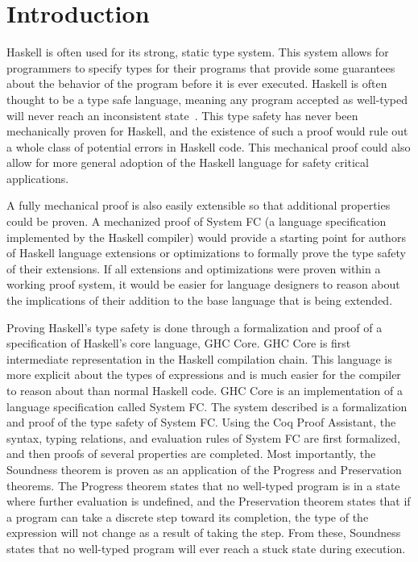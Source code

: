 \documentclass{sig-alternate}
\begin{document}

\section{Introduction}
\label{sec:intro}

Haskell is often used for its strong, static type system. This system allows for programmers to specify types for their programs that provide some guarantees about the behavior of the program before it is ever executed. Haskell is often thought to be a type safe language, meaning any program accepted as well-typed will never reach an inconsistent state~\cite{Pierce:SF}. This type safety has never been mechanically proven for Haskell, and the existence of such a proof would rule out a whole class of potential errors in Haskell code. This mechanical proof could also allow for more general adoption of the Haskell language for safety critical applications.

A fully mechanical proof is also easily extensible so that additional properties could be proven. A mechanized proof of System FC (a language specification implemented by the Haskell compiler) would provide a starting point for authors of Haskell language extensions or optimizations to formally prove the type safety of their extensions. If all extensions and optimizations were proven within a working proof system, it would be easier for language designers to reason about the implications of their addition to the base language that is being extended.

Proving Haskell's type safety is done through a formalization and proof of a specification of Haskell's core language, GHC Core. GHC Core is first intermediate representation in the Haskell compilation chain. This language is more explicit about the types of expressions and is much easier for the compiler to reason about than normal Haskell code. GHC Core is an implementation of a language specification called System FC. The system described is a formalization and proof of the type safety of System FC. Using the Coq Proof Assistant, the syntax, typing relations, and evaluation rules of System FC are first formalized, and then proofs of several properties are completed. Most importantly, the Soundness theorem is proven as an application of the Progress and Preservation theorems. The Progress theorem states that no well-typed program is in a state where further evaluation is undefined, and the Preservation theorem states that if a program can take a discrete step toward its completion, the type of the expression will not change as a result of taking the step. From these, Soundness states that no well-typed program will ever reach a stuck state during execution.
\end{document}
